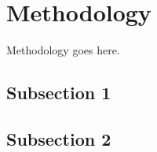 \section{Methodology} \label{section: methods}

Methodology goes here.


\subsection{Subsection 1}

\subsection{Subsection 2}
